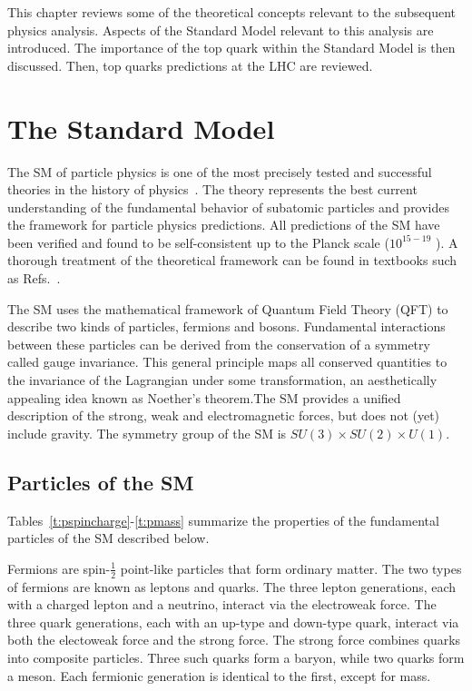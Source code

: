 

This chapter reviews some of the theoretical concepts relevant to the subsequent physics analysis. Aspects of the Standard Model relevant to this analysis are introduced. The importance of the top quark within the Standard Model is then discussed. Then, top quarks predictions at the LHC are reviewed.

\section{The Standard Model}

The SM of particle physics is one of the most precisely tested and successful theories in the history of physics~\cite{peskin}. The theory represents the best current understanding of the fundamental behavior of subatomic particles and provides the framework for particle physics predictions. All predictions of the SM have been verified and found to be self-consistent up to the Planck scale ($10^{15-19}$ \gev). A thorough treatment of the theoretical framework can be found in textbooks such as Refs.~\cite{peskin,halzen1984quarks,PDG}.

The SM uses the mathematical framework of Quantum Field Theory (QFT) to describe two kinds of particles, fermions and bosons. Fundamental interactions between these particles can be derived from the conservation of a symmetry called gauge invariance. This general principle maps all conserved quantities to the invariance of the Lagrangian under some transformation, an aesthetically appealing idea known as Noether's theorem.The SM provides a unified description of the strong, weak and electromagnetic forces, but does not (yet) include gravity. The symmetry group of the SM is $SU(3)\times SU(2)\times U(1)$.
\subsection{Particles of the SM}

Tables~\ref{t:pspincharge}-\ref{t:pmass} summarize the properties of the fundamental particles of the SM described below.

Fermions are spin-$\frac{1}{2}$ point-like particles that form ordinary matter. The two types of fermions are known as leptons and quarks. The three lepton generations, each with a charged lepton and a neutrino, interact via the electroweak force. The three quark generations, each with an up-type and down-type quark, interact via both the electoweak force and the strong force. The strong force combines quarks into composite particles. Three such quarks form a baryon, while two quarks form a meson. Each fermionic generation is identical to the first, except for mass. 

